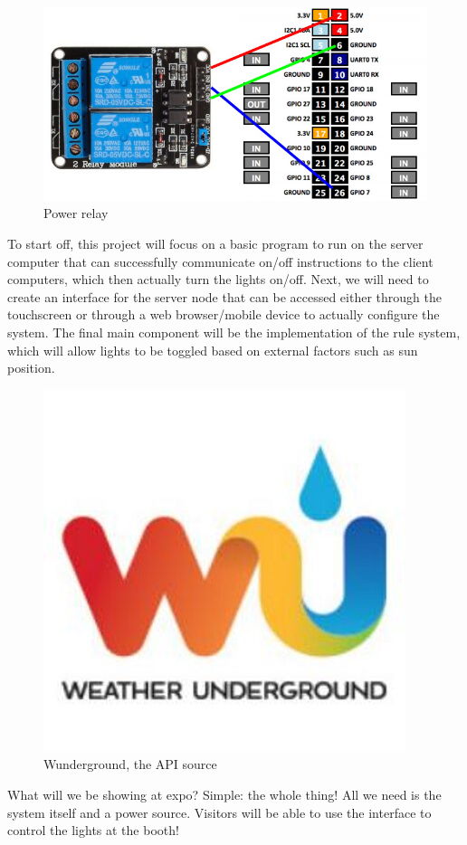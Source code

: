 \documentclass{article}
\begin{document}
\begin{figure}[h!]
\centering
\includegraphics[scale=0.5]{relay.jpg}
\caption{Power relay}
\label{fig:relay}
\end{figure}

To start off, this project will focus on a basic program to run on the server computer that can successfully communicate on/off instructions to the client computers, which then actually turn the lights on/off.  Next, we will need to create an interface for the server node that can be accessed either through the touchscreen or through a web browser/mobile device to actually configure the system.  The final main component will be the implementation of the rule system, which will allow lights to be toggled based on external factors such as sun position.

\begin{figure}[h!]
\centering
\includegraphics[scale=0.5]{wunder.jpeg}
\caption{Wunderground, the API source}
\label{fig:relay}
\end{figure}

What will we be showing at expo?  Simple: the whole thing!  All we need is the system itself and a power source.  Visitors will be able to use the interface to control the lights at the booth!
\end{document}
